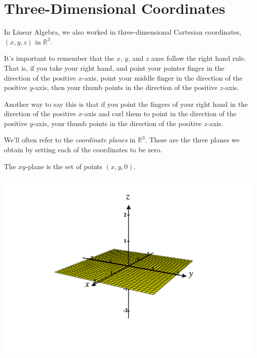 \documentclass{ximera}
\begin{document}
\section*{Three-Dimensional Coordinates}

In Linear Algebra, we also worked in three-dimensional Cartesian coordinates, $(x,y,z)$ in $\mathbb{R}^3$.

\begin{image}
\end{image}

It's important to remember that the $x$, $y$, and $z$ axes follow the right hand rule. That is, if you take your right hand, and point your pointer finger in the direction of the positive $x$-axis, point your middle finger in the direction of the positive $y$-axis, then your thumb points in the direction of the positive $z$-axis.

Another way to say this is that if you point the fingers of your right hand in the direction of the positive $x$-axis and curl them to point in the direction of the positive $y$-axis, your thumb points in the direction of the positive $z$-axis.


We'll often refer to the \emph{coordinate planes} in $\mathbb{R}^3$. These are the three planes we obtain by setting each of the coordinates to be zero.

The $xy$-plane is the set of points $(x,y,0)$.
\begin{image}
\includegraphics[width=\textwidth]{CalcPlot3D-xy_plane}
\end{image}
\end{document}

